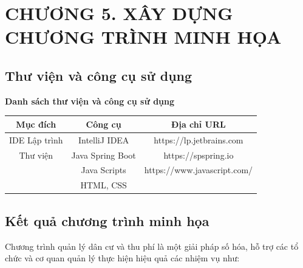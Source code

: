 \documentclass{article}
\begin{document}
\section*{CHƯƠNG 5. XÂY DỰNG CHƯƠNG TRÌNH MINH HỌA}
\setcounter{section}{5}
\setcounter{subsection}{0}
\subsection{Thư viện và công cụ sử dụng}
\begin{center}
    \textbf{Danh sách thư viện và công cụ sử dụng} \\
    \begin{tabular}{|c|c|c|}
        \hline
        \textbf{Mục đích} & \textbf{Công cụ} & \textbf{Địa chỉ URL} \\
        \hline
        IDE Lập trình & IntelliJ IDEA & https://lp.jetbrains.com\\
        \hline
        Thư viện & Java Spring Boot & https://spspring.io\\
         & Java Scripts & https://www.javascript.com/\\
         & HTML, CSS & \\
        \hline
    \end{tabular}
\end{center}
\subsection{Kết quả chương trình minh họa}
Chương trình quản lý dân cư và thu phí là một giải pháp số hóa, hỗ trợ các tổ chức và cơ quan quản lý thực hiện hiệu quả các nhiệm vụ như:
\end{document}
